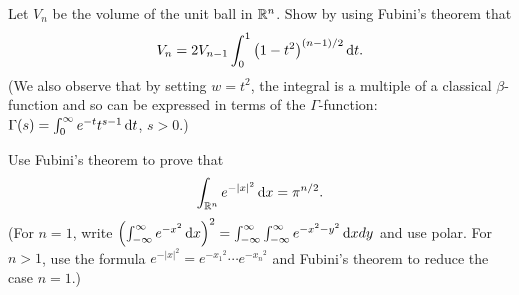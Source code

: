 \begin{problem}
  Let \(V_n\) be the volume of the unit ball in \(\mathbb{R}^n\). Show by using
  Fubini's theorem that
  \[
    V_n=2V_{n-1}\int_0^1\left(1-t^2\right)^{(n-1)/2}\mathop{}\!\mathrm{d} t.
  \]
  (We also observe that by setting \(w=t^2\), the integral is a multiple of
  a classical \(\beta\)-function and so can be expressed in terms of the
  \(\Gamma\)-function: \(\Gamma(s)=\int_0^\infty e^{-t}t^{s-1}\mathop{}\!\mathrm{d} t\),
  \(s>0\).)
\end{problem}
\begin{solution}
\end{solution}

\begin{problem}
  Use Fubini's theorem to prove that
  \[
    \int_{\mathbb{R}^n}e^{-| x |^2}\mathop{}\!\mathrm{d} x =\pi^{n/2}.
  \]
  (For \(n=1\), write
  \(\left(\int_{-\infty}^\infty e^{-x^2}\mathop{}\!\mathrm{d}
    x\right)^2=\int_{-\infty}^\infty\int_{-\infty}^\infty e^{-x^2-y^2}\mathop{}\!\mathrm{d}
  xdy\) and use polar. For \(n>1\), use the formula
  \(e^{-| x |^2}=e^{-{x_1}^2}\dotsm e^{-{x_n}^2}\) and Fubini's theorem to
  reduce the case \(n=1\).)
\end{problem}
\begin{solution}
\end{solution}

